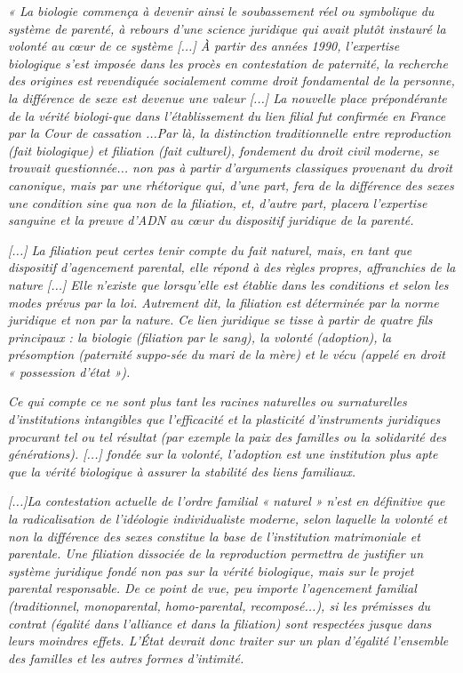   \begin{displayquote}
\emph{« La biologie commença à devenir ainsi le soubassement réel ou symbolique du système de parenté, à rebours d'une science juridique qui avait plutôt instauré la volonté au cœur de ce système [...] À partir des années 1990, l'expertise biologique  s'est imposée dans les procès en contestation de paternité, la recherche des origines est revendiquée socialement comme droit fondamental de la personne, la différence de sexe est devenue une valeur [...] La nouvelle place prépondérante de la vérité biologi-que dans l'établissement du lien filial fut confirmée en France par la Cour de cassation  ...Par là, la distinction traditionnelle entre reproduction (fait biologique) et filiation (fait culturel), fondement du droit civil moderne, se trouvait questionnée... non pas à partir d'arguments classiques provenant du droit canonique, mais par une rhétorique qui, d'une part, fera de la différence des sexes une condition sine qua non de la filiation, et, d'autre part, placera l'expertise sanguine et la preuve d'ADN au cœur du dispositif juridique de la parenté.}

\emph{[...] La filiation peut certes tenir compte du fait naturel, mais, en tant que dispositif d'agencement parental, elle répond à des règles propres, affranchies de la nature [...] Elle n'existe que lorsqu'elle est établie dans les conditions et selon les modes prévus par la loi. Autrement dit, la filiation est déterminée par la norme juridique et non par la nature. Ce lien juridique se tisse à partir de quatre fils principaux : la biologie (filiation par le sang), la volonté (adoption), la présomption (paternité suppo-sée du mari de la mère) et le vécu (appelé en droit « possession d'état »).}

\emph{Ce qui compte ce ne sont plus tant les racines naturelles ou surnaturelles d'institutions intangibles que l'efficacité et la plasticité d'instruments juridiques procurant tel ou tel résultat (par exemple la paix des familles ou la solidarité des générations).  [...] fondée sur la volonté, l'adoption est une institution plus apte que la vérité biologique à assurer la stabilité des liens familiaux.}

 \emph{[...]La contestation actuelle de l'ordre familial « naturel » n'est en définitive que la radicalisation de l'idéologie individualiste moderne, selon laquelle la volonté et non la différence des sexes constitue la base de l'institution matrimoniale et parentale. Une filiation dissociée de la reproduction permettra de justifier un système juridique fondé non pas sur la vérité biologique, mais sur le projet parental responsable. De ce point de vue, peu importe l'agencement familial (traditionnel, monoparental, homo-parental, recomposé...), si les prémisses du contrat (égalité dans l'alliance et dans la filiation) sont respectées jusque dans leurs moindres effets. L'État devrait donc traiter sur un plan d'égalité l'ensemble des familles et les autres formes d'intimité.}
 

\end{displayquote}
